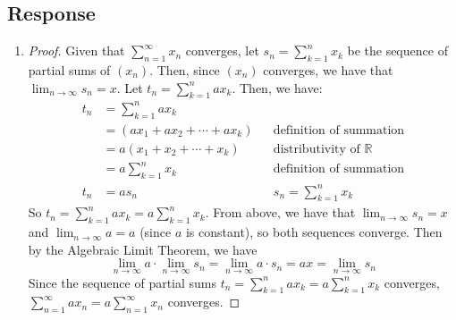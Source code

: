 \documentclass[13pt]{article}
\begin{document}
\subsection*{Response}
\begin{enumerate}[label=(\alph*)]
\item
  \begin{proof}
    Given that $\sum_{n = 1}^{\infty} x_{n}$ converges, let $s_{n} =
    \sum_{k = 1}^{n} x_{k}$ be the sequence of partial sums of
    $(x_{n})$. Then, since $(x_{n})$ converges, we have that $\lim_{n
      \rightarrow \infty} s_{n} = x$. Let $t_{n} = \sum_{k = 1}^{n}
    ax_{k}$. Then, we have: 
    \begin{align*}
      t_{n} &= \sum_{k = 1}^{n} ax_{k} \\
            &= (ax_{1} + ax_{2} + \cdots + ax_{k}) && \text{definition
                                                      of summation} \\
            &= a(x_{1} + x_{2} + \cdots + x_{k}) && \text{distributivity
                                                    of } \mathbb{R} \\
            &= a\sum_{k = 1}^{n} x_{k} && \text{definition of summation} \\
      t_{n} &= as_{n} && s_{n} = \sum_{k = 1}^{n} x_{k}
    \end{align*}
    So $t_{n} = \sum_{k = 1}^{n} ax_{k} = a\sum_{k = 1}^{n} x_{k}$.
    From above, we have that $\lim_{n \rightarrow \infty} s_{n} = x$ and
    $\lim_{n \rightarrow \infty} a = a$ (since $a$ is constant), so both sequences
    converge. Then by the Algebraic Limit Theorem, we have
    \[\lim_{n \rightarrow \infty} a \cdot \lim_{n \rightarrow \infty}
      s_{n} = \lim_{n \rightarrow \infty} a \cdot s_{n} = ax = \lim_{n
        \rightarrow \infty} s_n\] Since the
    sequence of partial sums $t_{n} = \sum_{k = 1}^{n} ax_{k} =
    a\sum_{k = 1}^{n} x_{k}$ converges, $\sum_{n = 1}^{\infty} ax_{n}
    = a\sum_{n = 1}^{\infty} x_{n}$ converges.   
  \end{proof}


\end{enumerate}
\end{document}
